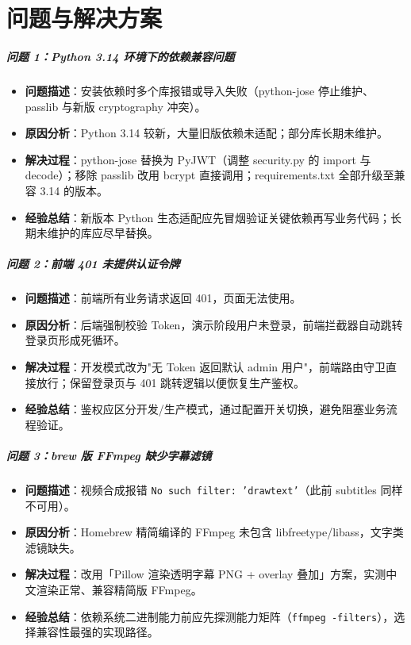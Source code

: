 \documentclass[12pt]{ctexrep}
\begin{document}
\chapter{问题与解决方案}

\paragraph{问题 1：Python 3.14 环境下的依赖兼容问题}
\begin{itemize}
\item \textbf{问题描述}：安装依赖时多个库报错或导入失败（python-jose 停止维护、passlib 与新版 cryptography 冲突）。
\item \textbf{原因分析}：Python 3.14 较新，大量旧版依赖未适配；部分库长期未维护。
\item \textbf{解决过程}：python-jose 替换为 PyJWT（调整 security.py 的 import 与 decode）；移除 passlib 改用 bcrypt 直接调用；requirements.txt 全部升级至兼容 3.14 的版本。
\item \textbf{经验总结}：新版本 Python 生态适配应先冒烟验证关键依赖再写业务代码；长期未维护的库应尽早替换。
\end{itemize}

\paragraph{问题 2：前端 401 未提供认证令牌}
\begin{itemize}
\item \textbf{问题描述}：前端所有业务请求返回 401，页面无法使用。
\item \textbf{原因分析}：后端强制校验 Token，演示阶段用户未登录，前端拦截器自动跳转登录页形成死循环。
\item \textbf{解决过程}：开发模式改为"无 Token 返回默认 admin 用户"，前端路由守卫直接放行；保留登录页与 401 跳转逻辑以便恢复生产鉴权。
\item \textbf{经验总结}：鉴权应区分开发/生产模式，通过配置开关切换，避免阻塞业务流程验证。
\end{itemize}

\paragraph{问题 3：brew 版 FFmpeg 缺少字幕滤镜}
\begin{itemize}
\item \textbf{问题描述}：视频合成报错 \texttt{No such filter: 'drawtext'}（此前 subtitles 同样不可用）。
\item \textbf{原因分析}：Homebrew 精简编译的 FFmpeg 未包含 libfreetype/libass，文字类滤镜缺失。
\item \textbf{解决过程}：改用「Pillow 渲染透明字幕 PNG + overlay 叠加」方案，实测中文渲染正常、兼容精简版 FFmpeg。
\item \textbf{经验总结}：依赖系统二进制能力前应先探测能力矩阵（\texttt{ffmpeg -filters}），选择兼容性最强的实现路径。
\end{itemize}
\end{document}
